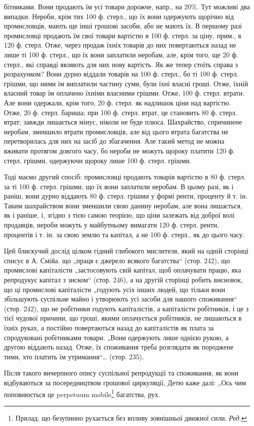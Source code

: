 \parcont{}  %
бітниками. Вони продають їм усі товари дорожче, напр., на 20\%. Тут можливі два випадки. Нероби, крім
тих 100 ф. стерл., що їх вони одержують щорічно від промисловців, мають ще інші грошові засоби, або
не мають їх. В першому разі промисловці продають їм свої товари вартістю в 100 ф. стерл. за ціну,
прим., в 120 ф. стерл. Отже, через продаж їхніх товарів до них повертаються назад не лише ті 100 ф.
стерл., що їх вони заплатили неробам, але, крім того, ще 20 ф. стерл., які справді являють для них
нову вартість. Як же тепер стоїть справа з розрахунком? Вони дурно віддали товарів на 100 ф. стерл.,
бо ті 100 ф. стерл. грішми, що ними їм виплатили частину суми, були їхні власні гроші. Отже, їхній
власний товар їм оплачено їхніми власними грішми. Отже, 100 ф. стерл. втрати. Але вони одержали,
крім того, 20 ф. стерл. як надлишок ціни над вартістю. Отже, 20 ф. стерл. бариша; при 100 ф. стерл.
втрат, це становить 80 ф. стерл. втрат; завжди лишається мінус, ніколи не буде плюса. Шахрайство,
спричинене неробам, зменшило втрати промисловців, але від цього втрата багатства не перетворилась
для них на засіб до збагачення. Але такий метод не можна вживати протягом довгого часу, бо нероби не
можуть щороку платити 120 ф. стерл. грішми, одержуючи щороку лише 100 ф. стерл. грішми.

Тоді маємо другий спосіб: промисловці продають товарів вартістю в 80 ф. стерл. за ті 100 ф. стерл.
грішми, що їх вони заплатили неробам. В цьому разі, як і раніш, вони дурно віддають 80 ф. стерл.
грішми у формі ренти, проценту й т. ін. Таким шахрайством вони зменшили свою данину неробам, але
вона лишається, як і раніше, і, згідно з тією самою теорією, що ціни залежать від доброї волі
продавців, нероби можуть у майбутньому вимагати 120 ф. стерл. ренти, процентів і т. ін. за свою
землю та капітал, а не 100 ф. стерл., як до цього часу.

Цей блискучий дослід цілком гідний глибокого мислителя, який на одній сторінці списує в А. Смійа. що
„праця є джерело всякого багатства“ (стор. 242), що промислові капіталісти „застосовують свій
капітал, щоб оплачувати працю, яка репродукує капітал з зиском“ (стор. 246), а на другій сторінці
робить висновок, що ці промислові капіталісти „годують
усіх інших людей, що тільки вони збільшують суспільне майно і утворюють усі засоби для нашого
споживання“ (стор. 242), що не робітники годують капіталістів, а капіталісти робітників, і це з тієї
чудової причини, що гроші, якими оплачується робітників, не лишаються в їхніх руках, а постійно
повертаються назад до капіталістів як плата за спродуковані робітниками товари. „Вони одержують лише
однією рукою, а другою віддають назад. Отже, їх споживання треба розглядати як породжене тими, хто
платить їм утримання“\dots{} (стор. 235).

Після такого вичерпного опису суспільної репродукції та споживання, як вони відбуваються за
посередництвом грошової циркуляції, Детю каже далі: „Ось чим поповнюється це perpetuum mobile\footnote*{Прилад, що безупинно рухається без впливу зовнішньої движної сили. \emph{Ред.}}
багатства, рух.
\parbreak{}  %

